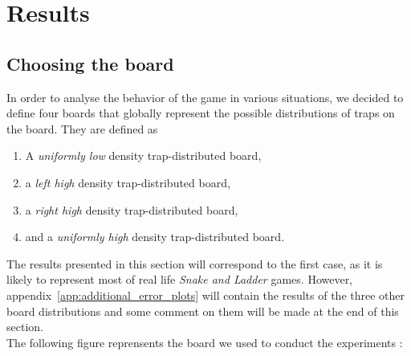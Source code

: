 \section{Results} %
\label{sec:results}

\subsection{Choosing the board} %
\label{sub:choosing_the_board}
In order to analyse the behavior of the game in various situations,
we decided to define four boards that globally represent the possible
distributions of traps on the board. They are defined as
\begin{enumerate}
  \item A \emph{uniformly low} density trap-distributed board,
  \item a \emph{left high} density trap-distributed board,
  \item a \emph{right high} density trap-distributed board,
  \item and a \emph{uniformly high} density trap-distributed board.
\end{enumerate}
The results presented in this section will correspond to the first case,
as it is likely to represent most of real life \emph{Snake and Ladder} games.
However, appendix~\ref{app:additional_error_plots} will contain the results
of the three other board distributions and some comment on them will be
made at the end of this section. \\
The following figure reprensents the board we used to conduct the experiments :  

